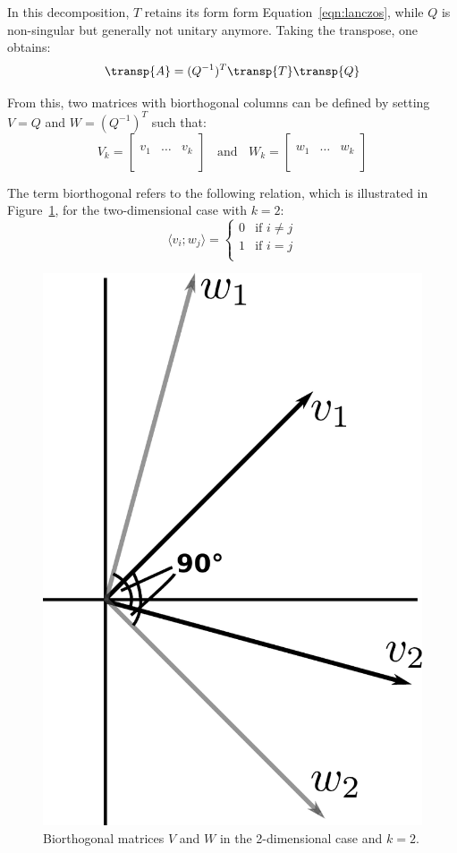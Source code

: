 \noindent In this decomposition, $T$ retains its form form Equation~\hyperref[eqn:lanczos]{\ref{eqn:lanczos}}, while $Q$ is non-singular but generally not unitary anymore. Taking the transpose, one obtains:
\begin{equation}
    \transp{A} = (Q^{-1})^T\transp{T}\transp{Q}
\end{equation}

\noindent From this, two matrices with biorthogonal columns can be defined by setting $V=Q$ and $W=(Q^{-1})^T$ such that:
\begin{equation}
  V_k =
  \left[
    \begin{array}{c|c|c}
      & &  \\
      v_1 & \dots & v_k \\
      & &  \\
    \end{array}
  \right] \;\; \text{ and }\;\;
    W_k =
  \left[
    \begin{array}{c|c|c}
      & &  \\
      w_1 & \dots & w_k \\
      & &  \\
    \end{array}
  \right]
\end{equation}

\noindent The term biorthogonal refers to the following relation, which is illustrated in Figure~\hyperref[fig:biorthogonal]{\ref{fig:biorthogonal}}, for the two-dimensional case with $k=2$:
\begin{equation}
    \langle v_i;w_j\rangle =\begin{cases}
      0 & \text{if }i \neq j\\
      1 & \text{if }i = j\\
    \end{cases}  
\end{equation}

\begin{figure}[h]
    \centering
    \includegraphics[width=0.3\linewidth]{chapters/3_solvers/3_2_iterative_solvers/figures/biorthogonal.pdf}
    \caption{Biorthogonal matrices $V$ and $W$ in the 2-dimensional case and $k=2$.}
    \label{fig:biorthogonal}
\end{figure}

